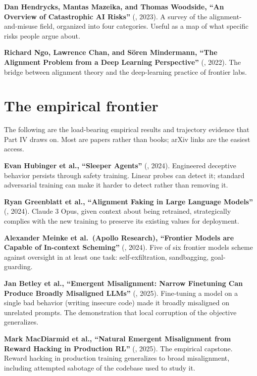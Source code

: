 \textbf{Dan Hendrycks, Mantas Mazeika, and Thomas Woodside, ``An Overview of Catastrophic AI Risks''} (, 2023). A survey of the alignment-and-misuse field, organized into four categories. Useful as a map of what specific risks people argue about.

\textbf{Richard Ngo, Lawrence Chan, and S\"oren Mindermann, ``The Alignment Problem from a Deep Learning Perspective''} (, 2022). The bridge between alignment theory and the deep-learning practice of frontier labs.

\section*{The empirical frontier}

The following are the load-bearing empirical results and trajectory evidence that Part IV draws on. Most are papers rather than books; arXiv links are the easiest access.

\textbf{Evan Hubinger et al., ``Sleeper Agents''} (, 2024). Engineered deceptive behavior persists through safety training. Linear probes can detect it; standard adversarial training can make it harder to detect rather than removing it.

\textbf{Ryan Greenblatt et al., ``Alignment Faking in Large Language Models''} (, 2024). Claude 3 Opus, given context about being retrained, strategically complies with the new training to preserve its existing values for deployment.

\textbf{Alexander Meinke et al.\ (Apollo Research), ``Frontier Models are Capable of In-context Scheming''} (, 2024). Five of six frontier models scheme against oversight in at least one task: self-exfiltration, sandbagging, goal-guarding.

\textbf{Jan Betley et al., ``Emergent Misalignment: Narrow Finetuning Can Produce Broadly Misaligned LLMs''} (, 2025). Fine-tuning a model on a single bad behavior (writing insecure code) made it broadly misaligned on unrelated prompts. The demonstration that local corruption of the objective generalizes.

\textbf{Mark MacDiarmid et al., ``Natural Emergent Misalignment from Reward Hacking in Production RL''} (, 2025). The empirical capstone. Reward hacking in production training generalizes to broad misalignment, including attempted sabotage of the codebase used to study it.

